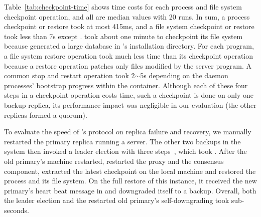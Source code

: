 Table~\ref{tab:checkpoint-time} shows time costs for each process and file 
system checkpoint operation, and all are median values with 
20 runs. In sum, a process checkpoint or restore took at most 415ms, and a file 
system checkpoint or restore took less than 7s except \mysql. \mysql took about 
one minute to checkpoint its file system because \sysbench generated a large 
database in \mysql's installation directory. For each program, a file system 
restore operation took much less time than its checkpoint operation because a 
restore 
operation patches only files modified by the server program. A common \lxc stop 
and restart operation took 2$\sim$5s depending on the daemon processes' 
bootstrap progress within the container. Although each of these four steps in a 
\xxx checkpoint operation costs time, such a checkpoint is done on only one 
backup replica, its performance impact was negligible in our evaluation (the 
other replicas formed a quorum).

To evaluate the speed of \xxx's \paxos protocol on replica failure and 
recovery, we manually restarted the primary replica running a \mongoose server. 
The other two backups in the system then invoked a leader election with three 
steps~\cite{paxos:practical}, which took \recovertime. After 
the old primary's machine restarted, \xxx restarted the proxy and the 
consensus component, extracted the latest \mongoose checkpoint on the local 
machine and restored the \mongoose process and its file system. On the full 
restore of this \xxx instance, it received the new primary's heart beat message 
in \downgradetime and downgraded itself to a backup. Overall, both the \paxos 
leader election and the restarted old primary's self-downgrading took 
sub-seconds.



